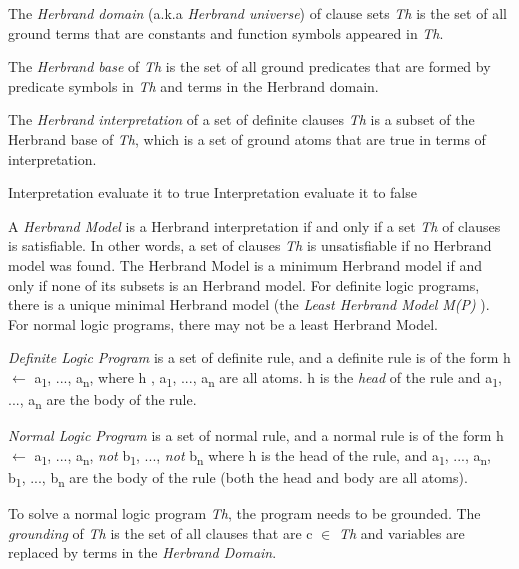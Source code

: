 \documentclass[12pt,twoside]{report}
\newtheorem{examp}{example}[section]
\begin{document}
The \textit{Herbrand domain} (a.k.a \textit{Herbrand universe}) of clause sets \textit{Th} is the set of all ground terms that are constants and function symbols appeared in \textit{Th}.

The \textit{Herbrand base} of \textit{Th} is the set of all ground predicates that are formed by predicate symbols in \textit{Th} and terms in the Herbrand domain.

The \textit{Herbrand interpretation} of a set of definite clauses \textit{Th} is a subset of the Herbrand base of \textit{Th}, which is a set of ground atoms that are true in terms of interpretation.

Interpretation evaluate it to true
Interpretation evaluate it to false

A \textit{Herbrand Model} is a Herbrand interpretation if and only if a set \textit{Th} of clauses is satisfiable. In other words, a set of clauses \textit{Th} is unsatisfiable if no Herbrand model was found. The Herbrand Model is a minimum Herbrand model if and only if none of its subsets is an Herbrand model. For definite logic programs, there is a unique minimal Herbrand model (the \textit{Least Herbrand Model} \textit{M(P)} ). For normal logic programs, there may not be a least Herbrand Model.

\textit{Definite Logic Program} is a set of definite rule, and  a definite rule is of the form h $\leftarrow$ a\textsubscript{1}, ..., a\textsubscript{n}, where h , a\textsubscript{1}, ..., a\textsubscript{n} are all atoms. h is the \textit{head} of the rule and a\textsubscript{1}, ..., a\textsubscript{n} are the body of the rule.

\textit{Normal Logic Program} is a set of normal rule, and a normal rule is of the form h $\leftarrow$ a\textsubscript{1}, ..., a\textsubscript{n}, \textit{not} b\textsubscript{1}, ..., \textit{not}  b\textsubscript{n} where h is the head of the rule,
 and a\textsubscript{1}, ..., a\textsubscript{n}, b\textsubscript{1}, ..., b\textsubscript{n} are the body of the rule (both the head and body are all atoms).

To solve a normal logic program \textit{Th}, the program needs to be grounded. The \textit{grounding} of \textit{Th} is the set of all clauses that are c $\in$ \textit{Th} and variables are replaced by terms in the \textit{Herbrand Domain}.
\end{document}
